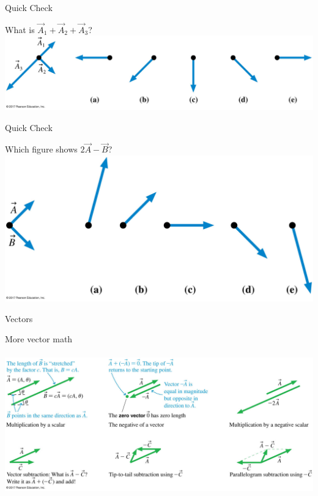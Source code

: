 \documentclass{beamer}
\newcommand{\red}[1]{{\color{red}{#1}}}
\newcommand{\checkL}[2]{\begin{textblock*}{1cm}(#1,#2){\Large \red{\Checkmark}}\end{textblock*}}
\begin{document}
\begin{frame}{Quick Check}
\begin{center}
   What is $\vec{A}_1 + \vec{A}_2 + \vec{A}_3$?
   \includegraphics[width=\textwidth]{../figures/Figure_STT3_1.jpg}
   \only<2->{\checkL{7.2cm}{5.8cm}}
\end{center}
\end{frame}

\begin{frame}{Quick Check}
\begin{center}
   Which figure shows $2\vec{A}-\vec{B}$?
   \includegraphics[width=\textwidth]{../figures/Figure_STT3_2.jpg}
   \only<2->{\checkL{3.8cm}{7.3cm}}
\end{center}
\end{frame}

\begin{frame}{Vectors}
\begin{center}
   More vector math \\~\\
   \includegraphics[width=\textwidth]{../figures/03_07_Figure.jpg}
\end{center}
\end{frame}
\end{document}
